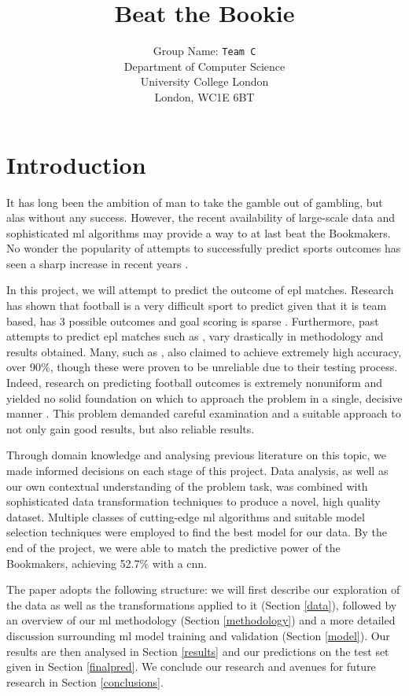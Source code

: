 \documentclass{article}
\title{Beat the Bookie}
\author{
 Group Name: \texttt{Team C}\\
  Department of Computer Science\\
  University College London\\
  London, WC1E 6BT\\
}
\begin{document}
\maketitle
\vspace{-2em}
\section{Introduction}
\label{intro}
It has long been the ambition of man to take the gamble out of gambling, but alas without any success. However, the recent availability of large-scale data and sophisticated \gls{ml} algorithms may provide a way to at last beat the Bookmakers. No wonder the popularity of attempts to successfully predict sports outcomes has seen a sharp increase in recent years \cite{horvat2020use}.  

In this project, we will attempt to predict the outcome of \gls{epl} matches. Research has shown that football is a very difficult sport to predict given that it is team based, has 3 possible outcomes and goal scoring is sparse \cite{horvat2020use}. Furthermore, past attempts to predict \gls{epl} matches such as \cite{knoll2020machine, teli2018prediction}, vary drastically in methodology and results obtained. Many, such as \cite{owramipur2013football}, also claimed to achieve extremely high accuracy, over 90\%, though these were proven to be unreliable due to their testing process. Indeed, research on predicting football outcomes is extremely nonuniform and yielded no solid foundation on which to approach the problem in a single, decisive manner \cite{horvat2020use}. This problem demanded careful examination and a suitable approach to not only gain good results, but also reliable results. 

Through domain knowledge and analysing previous literature on this topic, we made informed decisions on each stage of this project. Data analysis, as well as our own contextual understanding of the problem task, was combined with sophisticated data transformation techniques to produce a novel, high quality dataset. Multiple classes of cutting-edge \gls{ml} algorithms and suitable model selection techniques were employed to find the best model for our data. By the end of the project, we were able to match the predictive power of the Bookmakers, achieving 52.7\% with a \gls{cnn}.  

The paper adopts the following structure: we will first describe our exploration of the data as well as the transformations applied to it (Section \ref{data}), followed by an overview of our \gls{ml} methodology (Section \ref{methodology}) and a more detailed discussion surrounding \gls{ml} model training and validation (Section \ref{model}). Our results are then analysed in Section \ref{results} and our predictions on the test set given in Section \ref{finalpred}. We conclude our research and avenues for future research in Section \ref{conclusions}.  
\end{document}
